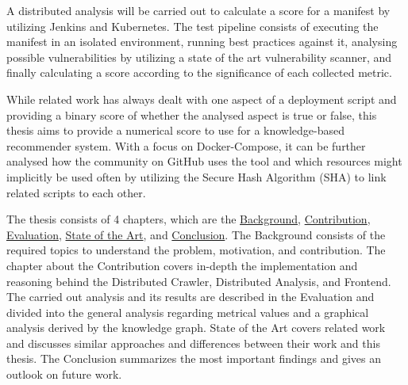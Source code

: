 A distributed analysis will be carried out to calculate a score for a manifest by utilizing Jenkins and Kubernetes. The test pipeline consists of executing the manifest in an isolated environment, running best practices against it, analysing possible vulnerabilities by utilizing a state of the art vulnerability scanner, and finally calculating a score according to the significance of each collected metric.

While related work has always dealt with one aspect of a deployment script and providing a binary score of whether the analysed aspect is true or false, this thesis aims to provide a numerical score to use for a knowledge-based recommender system. With a focus on Docker-Compose, it can be further analysed how the community on GitHub uses the tool and which resources might implicitly be used often by utilizing the Secure Hash Algorithm (SHA) to link related scripts to each other.

The thesis consists of 4 chapters, which are the \hyperref[sec:background]{Background}, \hyperref[sec:contribution]{Contribution}, \hyperref[sec:evaluation]{Evaluation}, \hyperref[sec:stateofart]{State of the Art}, and \hyperref[sec:conclusion]{Conclusion}. The Background consists of the required topics to understand the problem, motivation, and contribution. The chapter about the Contribution covers in-depth the implementation and reasoning behind the Distributed Crawler, Distributed Analysis, and Frontend. The carried out analysis and its results are described in the Evaluation and divided into the general analysis regarding metrical values and a graphical analysis derived by the knowledge graph. State of the Art covers related work and discusses similar approaches and differences between their work and this thesis. The Conclusion summarizes the most important findings and gives an outlook on future work.